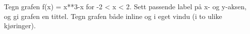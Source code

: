 %
%
Tegn grafen f(x) = x**3-x for -2 < x < 2. Sett passende label på x- og y-aksen, og gi grafen en tittel. Tegn grafen både inline og i eget vindu (i to ulike kjøringer).

